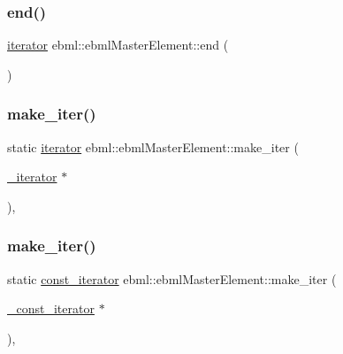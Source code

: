 \mbox{\label{classebml_1_1ebmlMasterElement_a9859bf4ba74c58ccc0eef1c9f6017719}} 
\subsubsection{\texorpdfstring{end()}{end()}}
{\footnotesize\ttfamily \mbox{\hyperlink{classebml_1_1ebmlMasterElement_1_1iterator}{iterator}} ebml\+::ebml\+Master\+Element\+::end (\begin{DoxyParamCaption}{ }\end{DoxyParamCaption})}

\mbox{\label{classebml_1_1ebmlMasterElement_a5c9950e1211b1dae82f84c64810317d0}} 
\subsubsection{\texorpdfstring{make\+\_\+iter()}{make\_iter()}\hspace{0.1cm}{\footnotesize\ttfamily [1/2]}}
{\footnotesize\ttfamily static \mbox{\hyperlink{classebml_1_1ebmlMasterElement_1_1iterator}{iterator}} ebml\+::ebml\+Master\+Element\+::make\+\_\+iter (\begin{DoxyParamCaption}\item[{\mbox{\hyperlink{classebml_1_1ebmlMasterElement_1_1__iterator}{\+\_\+iterator}} $\ast$}]{ }\end{DoxyParamCaption})\hspace{0.3cm}{\ttfamily [static]}, {\ttfamily [protected]}}

\mbox{\label{classebml_1_1ebmlMasterElement_a48eb2b65fb32886718ea29637c075052}} 
\subsubsection{\texorpdfstring{make\+\_\+iter()}{make\_iter()}\hspace{0.1cm}{\footnotesize\ttfamily [2/2]}}
{\footnotesize\ttfamily static \mbox{\hyperlink{classebml_1_1ebmlMasterElement_1_1const__iterator}{const\+\_\+iterator}} ebml\+::ebml\+Master\+Element\+::make\+\_\+iter (\begin{DoxyParamCaption}\item[{\mbox{\hyperlink{classebml_1_1ebmlMasterElement_1_1__const__iterator}{\+\_\+const\+\_\+iterator}} $\ast$}]{ }\end{DoxyParamCaption})\hspace{0.3cm}{\ttfamily [static]}, {\ttfamily [protected]}}

